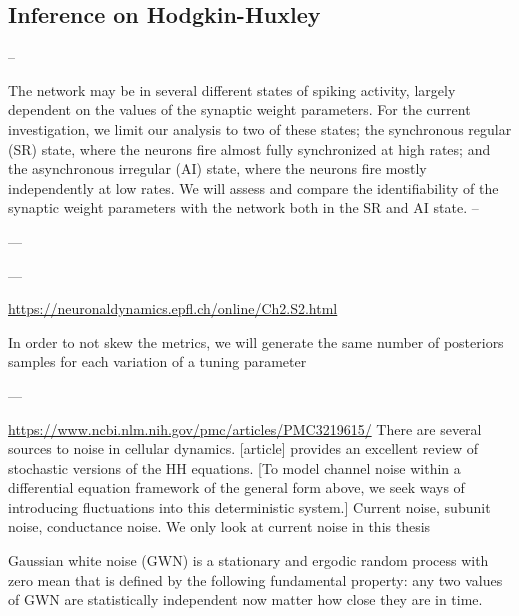 \subsection{Inference on Hodgkin-Huxley}




--

The network may be in several different states of spiking activity, largely dependent on the values of the synaptic weight parameters. For the current investigation, we limit our analysis to two of these states; the synchronous regular (SR) state, where the neurons fire almost fully synchronized at high rates; and the asynchronous irregular (AI) state, where the neurons fire mostly independently at low rates. We will assess and compare the identifiability of the synaptic weight parameters with the network both in the SR and AI state. 
--





---





---

\url{https://neuronaldynamics.epfl.ch/online/Ch2.S2.html}


In order to not skew the metrics, we will generate the same number of posteriors samples for each variation of a tuning parameter

---

\url{https://www.ncbi.nlm.nih.gov/pmc/articles/PMC3219615/}
There are several sources to noise in cellular dynamics. [article] provides an excellent review of stochastic versions of the HH equations. [To model channel noise within a differential equation framework of the general form above, we seek ways of introducing fluctuations into this deterministic system.] Current noise, subunit noise, conductance noise. We only look at current noise in this thesis

Gaussian white noise (GWN) is a stationary and ergodic random process with zero mean that is defined by the following fundamental property: any two values of GWN are statistically independent now matter how close they are in time. 

